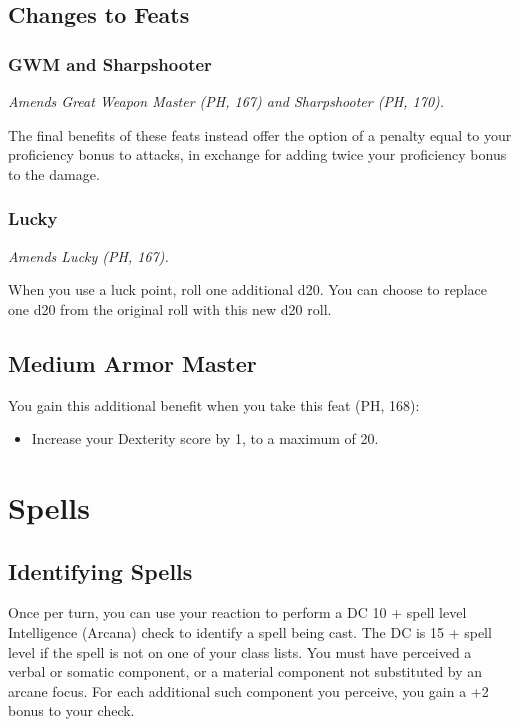 \documentclass[letterpaper,twocolumn,openany,nodeprecatedcode]{dndbook}
\begin{document}
\subsection{Changes to Feats}
\subsubsection{GWM and Sharpshooter}
\textit{Amends Great Weapon Master (PH, 167) and Sharpshooter (PH, 170).}

The final benefits of these feats instead offer the option of a penalty equal to your proficiency bonus to attacks, in exchange for adding twice your proficiency bonus to the damage.

\subsubsection{Lucky}
\textit{Amends Lucky (PH, 167).}

When you use a luck point, roll one additional d20. You can choose to replace one d20 from the original roll with this new d20 roll.

\subsection{Medium Armor Master}

You gain this additional benefit when you take this feat (PH, 168):

\begin{itemize}
\item Increase your Dexterity score by 1, to a maximum of 20.
\end{itemize}


\section{Spells}

\subsection{Identifying Spells}
Once per turn, you can use your reaction to perform a DC 10 + spell level Intelligence (Arcana) check to identify a spell being cast. The DC is 15 + spell level if the spell is not on one of your class lists. You must have perceived a verbal or somatic component, or a material component not substituted by an arcane focus. For each additional such component you perceive, you gain a +2 bonus to your check.
\end{document}
